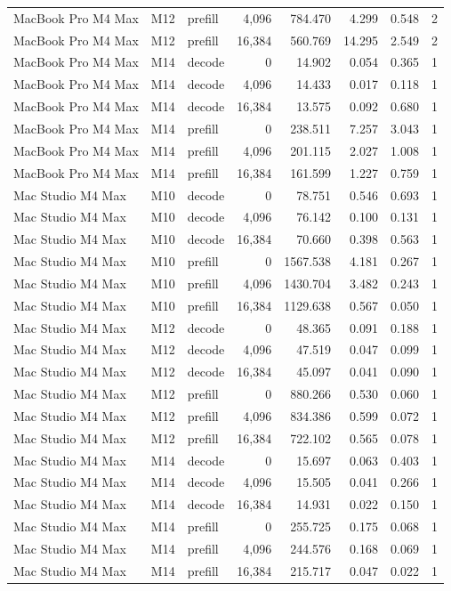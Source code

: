 \documentclass[10pt]{article}
\begin{document}
\begin{longtable}{@{}lllrrrrr@{}}
MacBook Pro M4 Max & M12 & prefill & 4,096 & 784.470 & 4.299 & 0.548 & 2 \\
MacBook Pro M4 Max & M12 & prefill & 16,384 & 560.769 & 14.295 & 2.549 & 2 \\
MacBook Pro M4 Max & M14 & decode & 0 & 14.902 & 0.054 & 0.365 & 1 \\
MacBook Pro M4 Max & M14 & decode & 4,096 & 14.433 & 0.017 & 0.118 & 1 \\
MacBook Pro M4 Max & M14 & decode & 16,384 & 13.575 & 0.092 & 0.680 & 1 \\
MacBook Pro M4 Max & M14 & prefill & 0 & 238.511 & 7.257 & 3.043 & 1 \\
MacBook Pro M4 Max & M14 & prefill & 4,096 & 201.115 & 2.027 & 1.008 & 1 \\
MacBook Pro M4 Max & M14 & prefill & 16,384 & 161.599 & 1.227 & 0.759 & 1 \\
Mac Studio M4 Max & M10 & decode & 0 & 78.751 & 0.546 & 0.693 & 1 \\
Mac Studio M4 Max & M10 & decode & 4,096 & 76.142 & 0.100 & 0.131 & 1 \\
Mac Studio M4 Max & M10 & decode & 16,384 & 70.660 & 0.398 & 0.563 & 1 \\
Mac Studio M4 Max & M10 & prefill & 0 & 1567.538 & 4.181 & 0.267 & 1 \\
Mac Studio M4 Max & M10 & prefill & 4,096 & 1430.704 & 3.482 & 0.243 & 1 \\
Mac Studio M4 Max & M10 & prefill & 16,384 & 1129.638 & 0.567 & 0.050 & 1 \\
Mac Studio M4 Max & M12 & decode & 0 & 48.365 & 0.091 & 0.188 & 1 \\
Mac Studio M4 Max & M12 & decode & 4,096 & 47.519 & 0.047 & 0.099 & 1 \\
Mac Studio M4 Max & M12 & decode & 16,384 & 45.097 & 0.041 & 0.090 & 1 \\
Mac Studio M4 Max & M12 & prefill & 0 & 880.266 & 0.530 & 0.060 & 1 \\
Mac Studio M4 Max & M12 & prefill & 4,096 & 834.386 & 0.599 & 0.072 & 1 \\
Mac Studio M4 Max & M12 & prefill & 16,384 & 722.102 & 0.565 & 0.078 & 1 \\
Mac Studio M4 Max & M14 & decode & 0 & 15.697 & 0.063 & 0.403 & 1 \\
Mac Studio M4 Max & M14 & decode & 4,096 & 15.505 & 0.041 & 0.266 & 1 \\
Mac Studio M4 Max & M14 & decode & 16,384 & 14.931 & 0.022 & 0.150 & 1 \\
Mac Studio M4 Max & M14 & prefill & 0 & 255.725 & 0.175 & 0.068 & 1 \\
Mac Studio M4 Max & M14 & prefill & 4,096 & 244.576 & 0.168 & 0.069 & 1 \\
Mac Studio M4 Max & M14 & prefill & 16,384 & 215.717 & 0.047 & 0.022 & 1 \\
\end{longtable}
\endgroup
\end{document}
